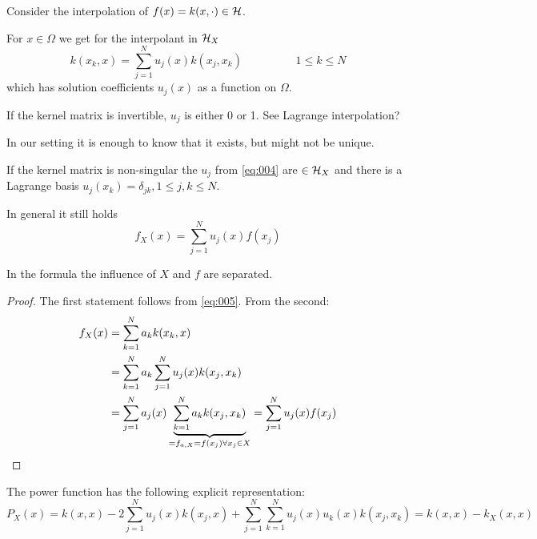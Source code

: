 

Consider the interpolation of $f(x)=k(x,\cdot)\in\mathcal{H}$.

For $x\in\Omega$ we get for the interpolant in $\mathcal{H}_X$
\begin{equation}\label{eq:005}
  k(x_k,x)=\sum_{j=1}^Nu_j(x)k(x_j,x_k) \hspace{2cm} 1\leq k\leq N  
\end{equation}
which has solution coefficients $u_j(x)$ as a function on $\Omega$.

\begin{aremark}
    If the kernel matrix is invertible, $u_j$ is either 0 or 1. See Lagrange interpolation?

    In our setting it is enough to know that it exists, but might not be unique.
\end{aremark}

\begin{theorem}\label{thm:2.3}
    If the kernel matrix is non-singular the $u_j$ from \ref{eq:004} are $\in\mathcal{H}_X$ and 
    there is a Lagrange basis $u_j(x_k)=\delta_{jk},1\leq j,k\leq N$.
    
    In general it still holds \[f_X(x)=\sum_{j=1}^N u_j(x)f(x_j)\]

    In the formula the influence of $X$ and $f$ are separated.

\end{theorem}


\begin{proof}
    The first statement follows from \ref{eq:005}. From the second:
    \begin{align*}
        f_X(x)&=\sum_{k=1}^N a_kk(x_k,x)\\
              &=\sum_{k=1}^N a_k\sum_{j=1}^N u_j(x)k(x_j,x_k)\\
              &=\sum_{j=1}^N a_j(x)\underbrace{\sum_{k=1}^{N} a_kk(x_j,x_k)}_{=f_{a,X}=f(x_j)\forall x_j\in X}=\sum_{j=1}^N u_j(x)f(x_j)\qedhere
    \end{align*}
\end{proof}

\begin{theorem}\label{thm:2.4}
    The power function has the following explicit representation:
    \[P_X(x)=k(x,x)-2\sum_{j=1}^N u_j(x)k(x_j,x)+\sum_{j=1}^N\sum_{k=1}^{N}u_j(x)u_k(x)k(x_j,x_k)=k(x,x)-k_X(x,x)\]
\end{theorem}

